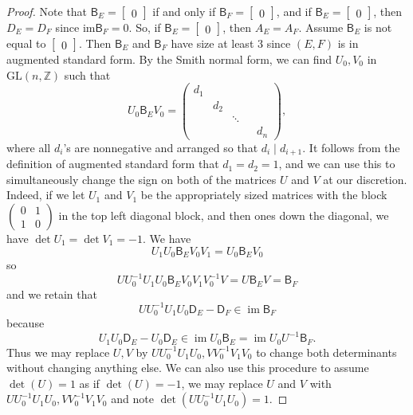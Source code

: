 \documentclass[12pt]{amsbook}%
\newcommand{\BB}{\mathsf B}
\newcommand{\DD}{\mathsf D}
\theoremstyle{defin}
\theoremstyle{remark}
\numberwithin{equation}{chapter}
\numberwithin{theor}{section}
\newcommand{\ZZ}{\mathbb{Z}}
\begin{document}
\begin{proof}
Note that $\BB_E= \begin{bmatrix} 0 \end{bmatrix}$ if and only if $\BB_F=\begin{bmatrix} 0 \end{bmatrix}$, and if $\BB_E  = \begin{bmatrix} 0 \end{bmatrix}$, then $D_E = D_F$ since $\mathrm{im} \BB_F = 0$.  So, if $\BB_E= \begin{bmatrix} 0 \end{bmatrix}$, then $A_E = A_F$.  Assume $\BB_E$ is not equal to $\begin{bmatrix} 0 \end{bmatrix}$.  Then $\BB_E$ and $\BB_F$ have size at least $3$ since $(E, F)$ is in augmented standard form.  By the Smith normal form, we can find $U_0,V_0$ in $\mathrm{GL}(n, \ZZ)$ such that 
\[
U_0\BB_EV_0=\begin{pmatrix}d_1&&&&\\&d_2&&&\\&&\ddots&&\\&&&& d_n\end{pmatrix},
\]
where all $d_i$'s are nonnegative and arranged so that $d_i\mid d_{i+1}$.  It follows from the definition of augmented standard form that $d_1=d_2=1$, and we can use this to simultaneously change the sign on both of the matrices $U$ and $V$ at our discretion.  Indeed, if we let $U_1$ and $V_1$ be the appropriately sized matrices with the block $\left(\begin{smallmatrix}0&1\\1&0\end{smallmatrix}\right)$ in the top left diagonal block, and then ones down the diagonal, we have $\det U_1=\det V_1=-1$. We have 
\[
U_1U_0\BB_E V_0V_1=U_0\BB_E V_0
\]
so
\[
UU_0^{-1}U_1U_0\BB_E V_0V_1V_0^{-1}V=U\BB_E V=\BB_F
\]
and we retain that 
\[
UU_0^{-1}U_1U_0\DD_E-\DD_F\in  \operatorname{im}\BB_F
\]
because
\[
U_1U_0\DD_E-U_0\DD_E\in  \operatorname{im}U_0\BB_E=\operatorname{im}U_0U^{-1}\BB_F.
\]
Thus we may replace $U,V$ by $UU_0^{-1}U_1U_0,VV_0^{-1}V_1V_0$ to change both determinants without changing anything else.  We can also use this procedure to assume $\det(U)=1$ as if $\det(U)=-1$, we may replace $U$ and $V$ with $UU_0^{-1}U_1U_0,VV_0^{-1}V_1V_0$ and note $\det(UU_0^{-1}U_1U_0)=1$.


\end{proof}
\end{document}
